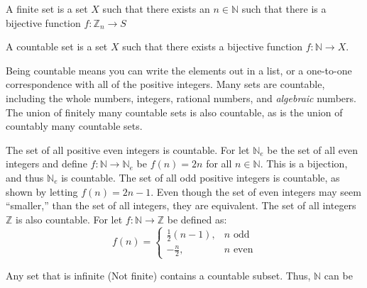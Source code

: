\documentclass[crop=false,class=book,oneside]{standalone}
\begin{document}
            \begin{definition}
                A finite set is a set $X$ such that there
                exists an $n\in\mathbb{N}$ such that there is
                a bijective function
                $f:\mathbb{Z}_{n}\rightarrow{S}$
            \end{definition}
            \begin{definition}
                A countable set is a set
                $X$ such that there exists a bijective
                function $f:\mathbb{N}\rightarrow{X}$.
            \end{definition}
            Being countable means you can write
            the elements out in a list, or a
            one-to-one correspondence with all of
            the positive integers. Many sets are countable,
            including the whole numbers, integers, rational
            numbers, and \textit{algebraic} numbers. The
            union of finitely many countable sets is also
            countable, as is the union of countably many
            countable sets.
            \begin{example}
                The set of all positive even integers is
                countable. For let $\mathbb{N}_{e}$ be the
                set of all even integers and define
                $f:\mathbb{N}\rightarrow\mathbb{N}_{e}$ be
                $f(n)=2n$ for all $n\in\mathbb{N}$. This is
                a bijection, and thus $\mathbb{N}_{e}$ is
                countable. The set of all odd positive integers
                is countable, as shown by letting
                $f(n)=2n-1$. Even though the set of even
                integers may seem ``smaller,'' than the set of
                all integers, they are equivalent. The set of
                all integers $\mathbb{Z}$ is also countable.
                For let $f:\mathbb{N}\rightarrow\mathbb{Z}$
                be defined as:
                \begin{equation}
                    f(n)=
                    \begin{cases}
                        \frac{1}{2}(n-1),&n\textrm{ odd}\\
                        -\frac{n}{2},&n\textrm{ even}
                    \end{cases}
                \end{equation}
            \end{example}
            Any set that is infinite (Not finite) contains a
            countable subset. Thus, $\mathbb{N}$ can be
\end{document}
